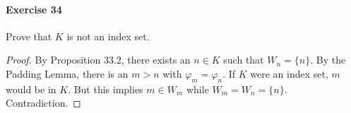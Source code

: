 \documentclass[a4paper,11pt]{article}
\begin{document}
\paragraph{Exercise 34}

Prove that $K$ is not an index set.

\begin{proof}
By Proposition 33.2, there exists an $n \in K$ such that $W_n = \{n\}$.
By the Padding Lemma, there is an $m > n$ with $\varphi_m = \varphi_n$.
If $K$ were an index set, $m$ would be in $K$.
But this implies $m \in W_m$ while $W_m = W_n = \{n\}$.
Contradiction.
\end{proof}
\end{document}
